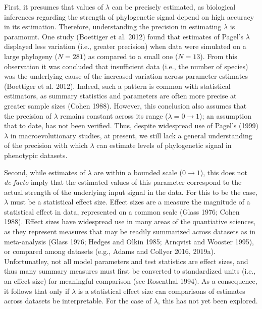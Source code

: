 \documentclass[
]{article}
\begin{document}
First, it presumes that values of \(\lambda\) can be precisely
estimated, as biological inferences regarding the strength of
phylogenetic signal depend on high accuracy in its estimation.
Therefore, understanding the precision in estimating \(\lambda\) is
paramount. One study (Boettiger et al. 2012) found that estimates of
Pagel's \(\lambda\) displayed less variation (i.e., greater precision)
when data were simulated on a large phylogeny (\(N=281\)) as compared to
a small one (\(N=13\)). From this observation it was concluded that
insufficient data (i.e., the number of species) was the underlying cause
of the increased variation across parameter estimates (Boettiger et al.
2012). Indeed, such a pattern is common with statistical estimators, as
summary statistics and parameters are often more precise at greater
sample sizes (Cohen 1988). However, this conclusion also assumes that
the precision of \(\lambda\) remains constant across its range
(\(\lambda = 0 \to 1\)); an assumption that to date, has not been
verified. Thus, despite widespread use of Pagel's (1999) \(\lambda\) in
macroevolutionary studies, at present, we still lack a general
understanding of the precision with which \(\lambda\) can estimate
levels of phylogenetic signal in phenotypic datasets. \hfill\break

Second, while estimates of \(\lambda\) are within a bounded scale
(\(0\to1\)), this does not \emph{de-facto} imply that the estimated
values of this parameter correspond to the actual strength of the
underlying input signal in the data. For this to be the case,
\(\lambda\) must be a statistical effect size. Effect sizes are a
measure the magnitude of a statistical effect in data, represented on a
common scale (Glass 1976; Cohen 1988). Effect sizes have widespread use
in many areas of the quantiative sciences, as they represent measures
that may be readily summarized across datasets as in meta-analysis
(Glass 1976; Hedges and Olkin 1985; Arnqvist and Wooster 1995), or
compared among datasets (e.g., Adams and Collyer 2016, 2019a).
Unfortunatley, not all model parameters and test statistics are effect
sizes, and thus many summary measures must first be converted to
standardized units (i.e., an effect size) for meaningful comparison (see
Rosenthal 1994). As a consequence, it follows that only if \(\lambda\)
is a statistical effect size can comparisons of estimates across
datasets be interpretable. For the case of \(\lambda\), this has not yet
been explored. \hfill\break
\end{document}
